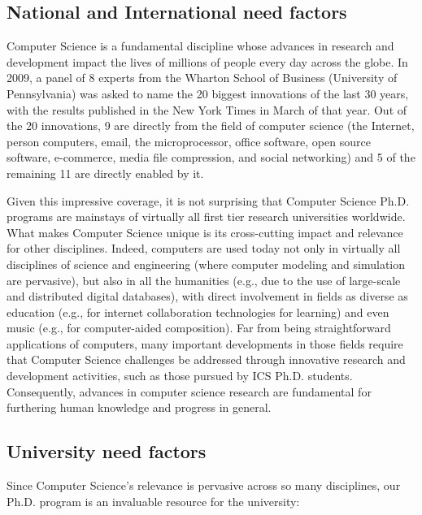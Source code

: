 \documentclass[12pt]{article}
\begin{document}
\subsection{National and International need factors}

Computer Science is a fundamental discipline whose advances in research and
development impact the lives of millions of people every day across the globe. In 2009, a
panel of 8 experts from the Wharton School of Business (University of
Pennsylvania) was asked to name the 20 biggest innovations of the last 30
years, with the results published in the New York Times in March of that
year. Out of the 20 innovations, 9 are directly from the field of computer
science (the Internet, person computers, email, the microprocessor, office
software, open source software, e-commerce, media file compression, and
social networking) and 5 of the remaining 11 are directly enabled by it.

Given this impressive coverage, it is not surprising that Computer Science
Ph.D. programs are mainstays of virtually all first tier research
universities worldwide.  What makes Computer Science unique is its
cross-cutting impact and relevance for other disciplines. Indeed, computers
are used today not only in virtually all disciplines of science and
engineering (where computer modeling and simulation are pervasive), but
also in all the humanities (e.g., due to the use of large-scale and
distributed digital databases), with direct involvement in fields as
diverse as education (e.g., for internet collaboration technologies for
learning) and even music (e.g., for computer-aided composition).  Far from
being straightforward applications of computers, many important
developments in those fields require that Computer Science challenges be
addressed through innovative research and development activities, such as
those pursued by ICS Ph.D. students.  Consequently, advances in computer
science research are fundamental for furthering human knowledge and
progress in general.

\subsection{University need factors}

Since Computer Science's relevance is pervasive across so many disciplines,
our Ph.D. program is an invaluable resource for the university:
\end{document}

